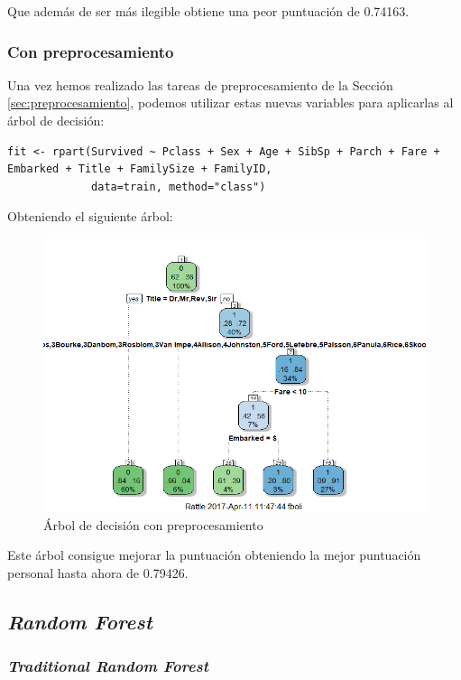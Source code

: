 Que además de ser más ilegible obtiene una peor puntuación de 0.74163.

\subsubsection{Con preprocesamiento}

Una vez hemos realizado las tareas de preprocesamiento de la Sección \ref{sec:preprocesamiento}, podemos utilizar estas nuevas variables para aplicarlas al árbol de decisión:

\begin{lstlisting}[style=R]
fit <- rpart(Survived ~ Pclass + Sex + Age + SibSp + Parch + Fare + Embarked + Title + FamilySize + FamilyID,
             data=train, method="class")
\end{lstlisting}

Obteniendo el siguiente árbol:

\begin{figure}[H]
	\centering
	\includegraphics[width=14cm]{img/preprocessing-decision-tree}
	\caption{Árbol de decisión con preprocesamiento}
	\label{fig:preprocessing-decision-tree}
\end{figure}

Este árbol consigue mejorar la puntuación obteniendo la mejor puntuación personal hasta ahora de 0.79426.

\subsection{\textit{Random Forest}}

\subsubsection{\textit{Traditional Random Forest}}

